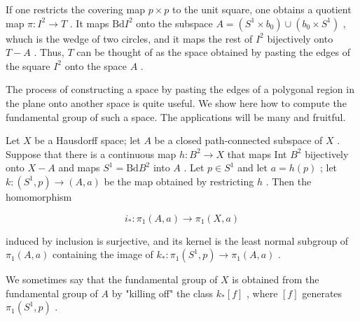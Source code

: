 If one restricts the covering map \(p \times  p\) to the unit square, one obtains a quotient map \(\pi  : {I}^{2} \rightarrow  T\) . It maps \(\mathrm{{Bd}}{I}^{2}\) onto the subspace \(A = \left( {{S}^{1} \times  {b}_{0}}\right)  \cup  \left( {{b}_{0} \times  {S}^{1}}\right)\) , whuch is the wedge of two circles, and it maps the rest of \({I}^{2}\) bijectively onto \(T - A\) . Thus, \(T\) can be thought of as the space obtained by pasting the edges of the square \({I}^{2}\) onto the space \(A\) .

The process of constructing a space by pasting the edges of a polygonal region in the plane onto another space is quite useful. We show here how to compute the fundamental group of such a space. The applications will be many and fruitful.

\begin{theorem} Let \(X\) be a Hausdorff space; let \(A\) be a closed path-connected subspace of \(X\) . Suppose that there is a continuous map \(h : {B}^{2} \rightarrow  X\) that maps Int \({B}^{2}\) bijectively onto \(X - A\) and maps \({S}^{1} = \mathrm{{Bd}}{B}^{2}\) into \(A\) . Let \(p \in  {S}^{1}\) and let \(a = h\left( p\right)\) ; let \(k : \left( {{S}^{1},p}\right)  \rightarrow  \left( {A,a}\right)\) be the map obtained by restricting \(h\) . Then the homomorphism

\[
{i}_{ * } : {\pi }_{1}\left( {A,a}\right)  \rightarrow  {\pi }_{1}\left( {X,a}\right)
\]

induced by inclusion is surjective, and its kernel is the least normal subgroup of \({\pi }_{1}\left( {A,a}\right)\) containing the image of \({k}_{ * } : {\pi }_{1}\left( {{S}^{1},p}\right)  \rightarrow  {\pi }_{1}\left( {A,a}\right)\) .

We sometimes say that the fundamental group of \(X\) is obtained from the fundamental group of \(A\) by "killing off" the class \({k}_{ * }\left\lbrack  f\right\rbrack\) , where \(\left\lbrack  f\right\rbrack\) generates \({\pi }_{1}\left( {{S}^{1},p}\right)\) .
\end{theorem}

